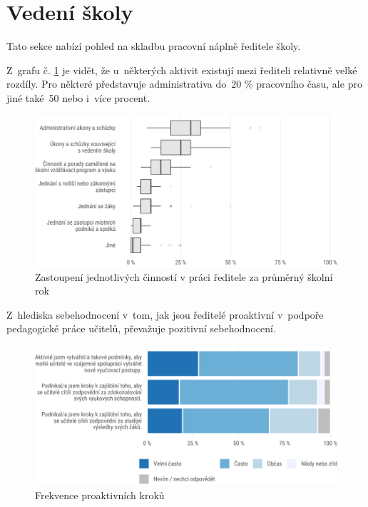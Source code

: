 \documentclass[12pt,a4paper,]{report}
\begin{document}
\newpage

\hypertarget{vedenuxed-ux161koly}{%
\section{Vedení školy}\label{vedenuxed-ux161koly}}

Tato sekce nabízí pohled na skladbu pracovní náplně ředitele školy.

Z~grafu č. \ref{fig:structure} je vidět, že u~některých aktivit existují mezi řediteli relativně velké rozdíly. Pro některé představuje administrativa do~20 \% pracovního času, ale pro jiné také~50 nebo i~více procent.

\begin{figure}

{\centering \includegraphics[width=\textwidth]{figs/structure-1} 

}

\caption{Zastoupení jednotlivých činností v práci ředitele za průměrný školní rok}\label{fig:structure}
\end{figure}

Z~hlediska sebehodnocení v~tom, jak jsou ředitelé proaktivní v~podpoře pedagogické práce učitelů, převažuje pozitivní sebehodnocení.

\begin{figure}

{\centering \includegraphics[width=\textwidth]{figs/proactive-1} 

}

\caption{Frekvence proaktivních kroků}\label{fig:proactive}
\end{figure}
\end{document}
